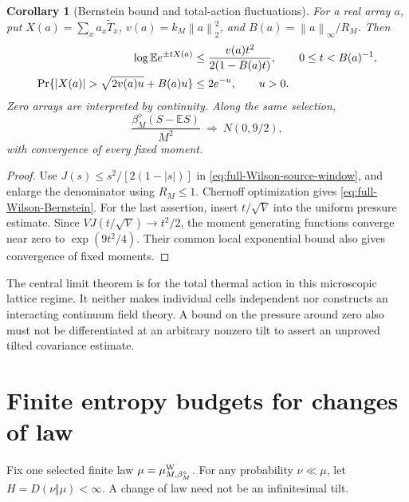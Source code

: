 \documentclass[11pt,oneside,openany]{book}
\newtheorem{corollary}[corollary]{Corollary}
\theoremstyle{definition}
\theoremstyle{remark}
\newcommand{\E}{\mathbb E}
\newcommand{\norm}[1]{\left\lVert#1\right\rVert}
\begin{document}
\begin{corollary}[Bernstein bound and total-action fluctuations]
\label{cor:full-Wilson-Bernstein}
For a real array $a$, put $X(a)=\sum_xa_x\widetilde T_x$,
$v(a)=k_M\norm{a}_2^2$, and $B(a)=\norm{a}_\infty/R_M$. Then
\begin{align}
 \log\E e^{\pm tX(a)}
   &\le\frac{v(a)t^2}{2(1-B(a)t)},\qquad 0\le t<B(a)^{-1},\notag\\
 \Pr\{|X(a)|>\sqrt{2v(a)u}+B(a)u\}&\le2e^{-u},\qquad u>0.
 \label{eq:full-Wilson-Bernstein}
\end{align}
Zero arrays are interpreted by continuity. Along the same selection,
\begin{equation}
 \frac{\beta_M^\diamond(S-\E S)}{M^2}
                         \ \Longrightarrow\ N(0,9/2),
 \label{eq:full-Wilson-action-CLT}
\end{equation}
with convergence of every fixed moment.
\end{corollary}
\begin{proof}
Use $J(s)\le s^2/[2(1-|s|)]$ in
\cref{eq:full-Wilson-source-window}, and enlarge the denominator using
$R_M\le1$. Chernoff optimization gives
\cref{eq:full-Wilson-Bernstein}. For the last assertion, insert
$t/\sqrt V$ into the uniform pressure estimate. Since
$VJ(t/\sqrt V)\to t^2/2$, the moment generating functions converge
near zero to $\exp(9t^2/4)$. Their common local exponential bound
also gives convergence of fixed moments.
\end{proof}
The central limit theorem is for the total thermal action in this
microscopic lattice regime. It neither makes individual cells
independent nor constructs an interacting continuum field theory.
A bound on the pressure around zero also must not be differentiated
at an arbitrary nonzero tilt to assert an unproved tilted covariance
estimate.

\section{Finite entropy budgets for changes of law}
\label{sec:entropy-source-transport}
Fix one selected finite law $\mu=\mu^{\rm W}_{M,\beta_M^\diamond}$.
For any probability $\nu\ll\mu$, let
$H=D(\nu\Vert\mu)<\infty$. A change of law need not be an
infinitesimal tilt.
\end{document}
